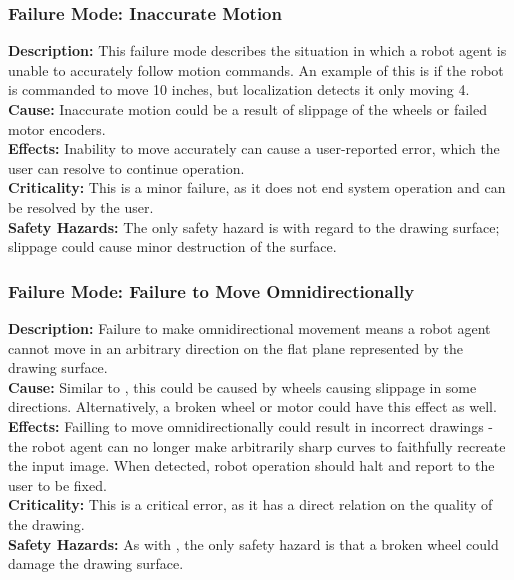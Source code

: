\subsubsection{Failure Mode: Inaccurate Motion}
\label{sec:locomotion_fm_motion}
\textbf{Description:} This failure mode describes the situation in which a robot agent is unable to accurately follow motion commands. An example of this is if the robot is commanded to move 10 inches, but localization detects it only moving 4.\\
\textbf{Cause:} Inaccurate motion could be a result of slippage of the wheels or failed motor encoders.\\
\textbf{Effects:} Inability to move accurately can cause a user-reported error, which the user can resolve to continue operation. \\
\textbf{Criticality:}  This is a minor failure, as it does not end system operation and can be resolved by the user.\\
\textbf{Safety Hazards:} The only safety hazard is with regard to the drawing surface; slippage could cause minor destruction of the surface.

\subsubsection{Failure Mode: Failure to Move Omnidirectionally}
\label{sec:locomotion_fm_omni}
\textbf{Description:} Failure to make omnidirectional movement means a robot agent cannot move in an arbitrary direction on the flat plane represented by the drawing surface.\\
\textbf{Cause:} Similar to , this could be caused by wheels causing slippage in some directions. Alternatively, a broken wheel or motor could have this effect as well.\\
\textbf{Effects:} Failling to move omnidirectionally could result in incorrect drawings - the robot agent can no longer make arbitrarily sharp curves to faithfully recreate the input image. When detected, robot operation should halt and report to the user to be fixed.\\
\textbf{Criticality:}  This is a critical error, as it has a direct relation on the quality of the drawing.\\
\textbf{Safety Hazards:} As with , the only safety hazard is that a broken wheel could damage the drawing surface.